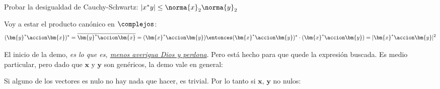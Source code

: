 \begin{enunciado}{\ejExtra}
  Probar la desigualdad de Cauchy-Schwartz: $|x^*y| \leq \norma{x}_2 \norma{y}_2$
\end{enunciado}

Voy a estar el producto canónico en $\complejos$:
$$
  (\bm{y}^* \accion \bm{x})^* = \overline{\bm{y}^* \accion \bm{x}}  =  (\bm{x}^* \accion \bm{y})
  \entonces
  (\bm{x}^* \accion \bm{y})^* \cdot (\bm{x}^* \accion \bm{y}) = |\bm{x}^* \accion \bm{y}|^2
$$

El inicio de la demo, \textit{es lo que es, \ul{menos averigua Dios y perdona}}. Pero está hecho para que quede la expresión buscada.
Es medio particular, pero dado que $\bm{x}$ y $\bm{y}$ son genéricos, la demo vale en general:

Si alguno de los vectores es nulo no hay nada que hacer, es trivial. Por lo tanto si $\bm{x},\, \bm{y}$ no nulos:
